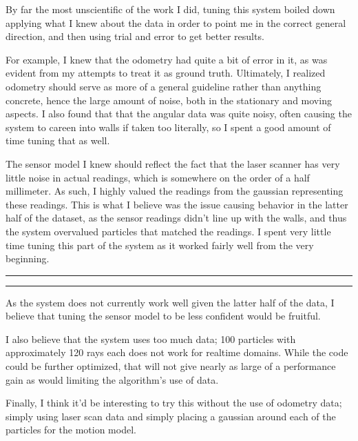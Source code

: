 \documentclass[11pt]{article}
\newcommand{\topic}[1] {\vspace{.25in} \hrule\vspace{0.5em}
  \noindent{\bf #1} \vspace{0.5em}
  \hrule \vspace{.10in}}
\begin{document}
By far the most unscientific of the work I did, tuning this system boiled down
applying what I knew about the data in order to point me in the correct general
direction, and then using trial and error to get better results.

For example, I knew that the odometry had quite a bit of error in it, as was
evident from my attempts to treat it as ground truth. Ultimately, I realized
odometry should serve as more of a general guideline rather than anything
concrete, hence the large amount of noise, both in the stationary and moving
aspects. I also found that that the angular data was quite noisy, often causing
the system to careen into walls if taken too literally, so I spent a good amount
of time tuning that as well.

The sensor model I knew should reflect the fact that the laser scanner has very
little noise in actual readings, which is somewhere on the order of a half
millimeter. As such, I highly valued the readings from the gaussian representing
these readings. This is what I believe was the issue causing behavior in the
latter half of the dataset, as the sensor readings didn't line up with the
walls, and thus the system overvalued particles that matched the readings. I
spent very little time tuning this part of the system as it worked fairly well
from the very beginning.

\topic{Future Work}

As the system does not currently work well given the latter half of the data, I
believe that tuning the sensor model to be less confident would be fruitful.

I also believe that the system uses too much data; 100 particles with
approximately 120 rays each does not work for realtime domains. While the code
could be further optimized, that will not give nearly as large of a performance
gain as would limiting the algorithm's use of data.

Finally, I think it'd be interesting to try this without the use of odometry
data; simply using laser scan data and simply placing a gaussian around each of
the particles for the motion model.
\end{document}
